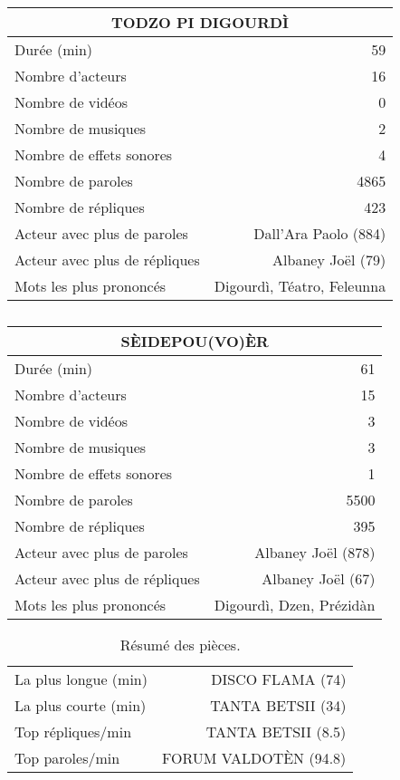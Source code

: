     \begin{table}[]
    \centering
    \caption{}
    \begin{tabular}{lr}\toprule\multicolumn{2}{c}{TODZO PI DIGOURDÌ} \\\midrule
\multicolumn{1}{l}{Durée (min)}&59\\
\multicolumn{1}{l}{Nombre d'acteurs}&16\\
\multicolumn{1}{l}{Nombre de vidéos}&0\\
\multicolumn{1}{l}{Nombre de musiques}&2\\
\multicolumn{1}{l}{Nombre de effets sonores}&4\\
\multicolumn{1}{l}{Nombre de paroles}&4865\\
\multicolumn{1}{l}{Nombre de répliques}&423\\
\multicolumn{1}{l}{Acteur avec plus de paroles}&Dall'Ara Paolo (884)\\
\multicolumn{1}{l}{Acteur avec plus de répliques}&Albaney Joël (79)\\
\multicolumn{1}{l}{Mots les plus prononcés}&Digourdì, Téatro, Feleunna\\
    \bottomrule
    \end{tabular}%
    \end{table}
    \begin{table}[]
    \centering
    \caption{}
    \begin{tabular}{lr}\toprule\multicolumn{2}{c}{SÈIDEPOU(VO)ÈR} \\\midrule
\multicolumn{1}{l}{Durée (min)}&61\\
\multicolumn{1}{l}{Nombre d'acteurs}&15\\
\multicolumn{1}{l}{Nombre de vidéos}&3\\
\multicolumn{1}{l}{Nombre de musiques}&3\\
\multicolumn{1}{l}{Nombre de effets sonores}&1\\
\multicolumn{1}{l}{Nombre de paroles}&5500\\
\multicolumn{1}{l}{Nombre de répliques}&395\\
\multicolumn{1}{l}{Acteur avec plus de paroles}&Albaney Joël (878)\\
\multicolumn{1}{l}{Acteur avec plus de répliques}&Albaney Joël (67)\\
\multicolumn{1}{l}{Mots les plus prononcés}&Digourdì, Dzen, Prézidàn\\
    \bottomrule
    \end{tabular}%
    \end{table}
\begin{table}[h]
\centering
\caption{Résumé des pièces.}
\begin{tabular}{lr}
    \toprule
La plus longue (min) & DISCO FLAMA (74) \\
La plus courte (min) & TANTA BETSII (34) \\
Top répliques/min & TANTA BETSII (8.5) \\
Top paroles/min & FORUM VALDOTÈN (94.8) \\
\bottomrule
\end{tabular}%
\end{table}